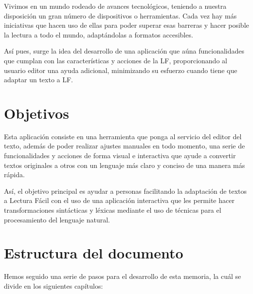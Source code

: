 \setlength{\parskip}{10pt}
Vivimos en un mundo rodeado de avances tecnológicos, teniendo a nuestra disposición un gran número de dispositivos o herramientas. Cada vez hay más iniciativas que hacen uso de ellas para poder superar esas barreras y hacer posible la lectura a todo el mundo, adaptándolas a formatos accesibles. 


\setlength{\parskip}{10pt} 
 
Así pues, surge la idea del desarrollo de una aplicación que aúna funcionalidades que cumplan con las características y acciones de la LF, proporcionando al usuario editor una ayuda adicional, minimizando su esfuerzo cuando tiene que adaptar un texto a LF.


\section{Objetivos}
Esta aplicación consiste en una herramienta que ponga al servicio del editor del texto, además de poder realizar ajustes manuales en todo momento, una serie de funcionalidades y acciones de forma visual e interactiva que ayude a convertir textos originales a otros con un lenguaje más claro y conciso de una manera más rápida.  

 \setlength{\parskip}{10pt}
 
Así, el objetivo principal es ayudar a personas facilitando la adaptación de textos a Lectura Fácil con el uso de una aplicación interactiva que les permite hacer transformaciones sintácticas y léxicas mediante el uso de técnicas para el procesamiento del lenguaje natural. 

 

\section{Estructura del documento}


Hemos seguido una serie de pasos para el desarrollo de esta memoria, la cuál se divide en los siguientes capítulos:

